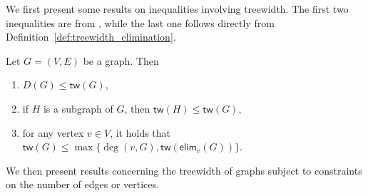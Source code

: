 \documentclass[letterpaper,11pt]{article}
\newcommand{\degp}[2]{\deg(#1,#2)}
\newcommand{\treewidthp}[1]{\mathsf{tw}(#1)}
\newcommand{\degeneracy}{D}
\newcommand{\degeneracyg}[1]{\degeneracy(#1)}
\newcommand{\eliminatevg}[2]{\mathsf{elim}_{#1}(#2)}
\begin{document}
\begin{bibunit}[plainnat]
We first present some results on inequalities involving treewidth. The first two inequalities are from \citet{bodlaender2011treewidth}, while the last one follows directly from Definition~\ref{def:treewidth_elimination}.

\begin{lemma}
\label{lem:simple_bounds_on_treewidth}
Let $G = (V, E)$ be a graph. Then
\begin{enumerate}
    \item $ \degeneracyg{G} \leq \treewidthp{G},$
    
    \item if $H$ is a subgraph of $G$, then $\treewidthp{H} \leq \treewidthp{G}$, 
    
    \item for any vertex $v \in V$, it holds that $\treewidthp{G} \leq \max \{\degp{v}{G}, \treewidthp{\eliminatevg{v}{G}} \}$.
\end{enumerate}
\end{lemma}

We then present results concerning the treewidth of graphs subject to constraints on the number of edges or vertices.


\end{bibunit}
\end{document}

